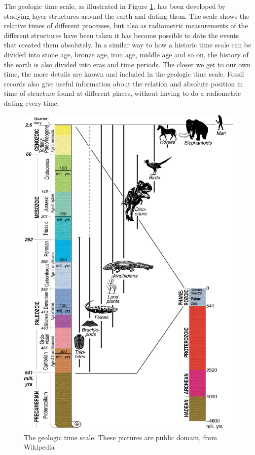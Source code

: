 \documentclass[a4paper,12pt]{report}
\begin{document}
The geologic time scale, as illustrated in Figure \ref{fig:geoTime}, has been developed by studying layer structures around the earth and dating them. The scale shows the relative times of different processes, but also as radiometric measurements of the different structures have been taken it has become possible to date the events that created them absolutely. In a similar way to how a historic time scale can be divided into stone age, bronze age, iron age, middle age and so on, the history of the earth is also divided into eras and time periods. The closer we get to our own time, the more details are known and included in the geologic time scale. Fossil records also give useful information about the relation and absolute position in time of structure found at different places, without having to do a radiometric dating every time.

\begin{figure}
 \includegraphics[width=\linewidth]{thesis/geo/english/time.jpg}
 \caption{The geologic time scale. These pictures are public domain, from Wikipedia}
 \label{fig:geoTime}
\end{figure}
\end{document}
